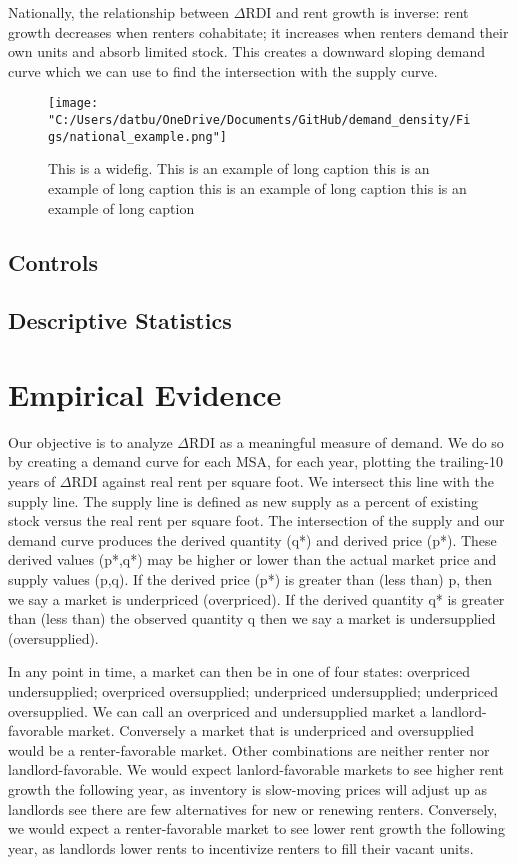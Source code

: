 \documentclass[sn-mathphys-num]{sn-jnl}%
\theoremstyle{thmstyleone}%
\theoremstyle{thmstyletwo}%
\theoremstyle{thmstylethree}%
\begin{document}
Nationally, the relationship between $\Delta\text{RDI}$ and rent growth is inverse: rent growth decreases when renters cohabitate; it increases when renters demand their own units and absorb limited stock. This creates a downward sloping demand curve which we can use to find the intersection with the supply curve. 

\begin{figure}[H]
	\centering
	\texttt{[image: "C:/Users/datbu/OneDrive/Documents/GitHub/demand\_density/Figs/national\_example.png"]}
	\caption{This is a widefig. This is an example of long caption this is an example of long caption  this is an example of long caption this is an example of long caption}\label{fig4}
\end{figure}
\subsection{Controls}
\subsection{Descriptive Statistics}


\section{Empirical Evidence}\label{sec2}
Our objective is to analyze $\Delta\text{RDI}$ as a meaningful measure of demand. We do so by creating a demand curve for each MSA, for each year, plotting the trailing-10 years of $\Delta\text{RDI}$ against real rent per square foot. We intersect this line with the supply line. The supply line is defined as new supply as a percent of existing stock versus the real rent per square foot. The intersection of the supply and our demand curve produces the derived quantity (q*) and derived price (p*). These derived values (p*,q*) may be higher or lower than the actual market price and supply values (p,q). If the derived price (p*) is greater than (less than) p, then we say a market is underpriced (overpriced). If the derived quantity q* is greater than (less than) the observed quantity q then we say a market is undersupplied (oversupplied).

In any point in time, a market can then be in one of four states: overpriced undersupplied; overpriced oversupplied; underpriced undersupplied; underpriced oversupplied. We can call an overpriced and undersupplied market a landlord-favorable market. Conversely a market that is underpriced and oversupplied would be a renter-favorable market. Other combinations are neither renter nor landlord-favorable. We would expect lanlord-favorable markets to see higher rent growth the following year, as inventory is slow-moving prices will adjust up as landlords see there are few alternatives for new or renewing renters. Conversely, we would expect a renter-favorable market to see lower rent growth the following year, as landlords lower rents to incentivize renters to fill their vacant units. 
\end{document}
